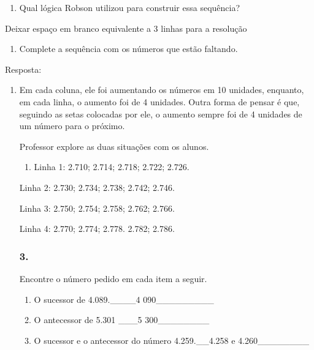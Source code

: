 \begin{enumerate}
\begin{escolha}
\begin{enumerate}
\def\labelenumi{\alph{enumi})}
\item
  Qual lógica Robson utilizou para construir essa sequência?
\end{enumerate}

Deixar espaço em branco equivalente a 3 linhas para a resolução

\begin{enumerate}
\def\labelenumi{\alph{enumi})}
\item
  Complete a sequência com os números que estão faltando.
\end{enumerate}

Resposta:

\begin{enumerate}
\def\labelenumi{\alph{enumi})}
\item
  Em cada coluna, ele foi aumentando os números em 10 unidades, enquanto,
  em cada linha, o aumento foi de 4 unidades. Outra forma de pensar é que, seguindo as setas colocadas
por ele, o aumento sempre foi de 4 unidades de um número para o próximo.

Professor explore as duas situações com os alunos.

\begin{enumerate}
\def\labelenumi{\alph{enumi})}
\item
  Linha 1: 2.710; 2.714; 2.718; 2.722; 2.726.
\end{enumerate}

Linha 2: 2.730; 2.734; 2.738; 2.742; 2.746.

Linha 3: 2.750; 2.754; 2.758; 2.762; 2.766.

Linha 4: 2.770; 2.774; 2.778. 2.782; 2.786.


\subsubsection{3.}\label{section-28}

Encontre o número pedido em cada item a seguir.

\begin{enumerate}
\def\labelenumi{\alph{enumi})}
\item
  O sucessor de 4.089.\_\_\_\_4 090\_\_\_\_\_\_\_\_\_
\item
  O antecessor de 5.301 \_\_\_5 300\_\_\_\_\_\_\_\_
\item
  O sucessor e o antecessor do número 4.259.\_\_4.258 e 4.260\_\_\_\_\_\_\_\_
\end{enumerate}



\end{enumerate}
\end{escolha}
\end{enumerate}
